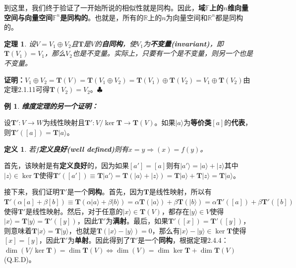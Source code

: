\documentclass[mathserif,hyperref,UTF8,openany,b5paper]{ctexbook}
\newtheorem{exmp}{例}[section]
\newtheorem{defn}{定义}[section]
\newtheorem{thm}{定理}[section]
\begin{document}
到这里，我们终于验证了一开始所说的相似性就是同构。因此，\textbf{域$\mathbb{F}$上的$n$维向量空间与向量空间$\mathbb{F}^n$是同构的}。也就是，所有的$\mathbb{R}$上的$n$为向量空间和$\mathbb{R}^n$都是同构的。
\begin{thm}
设$V = V_1\oplus V_2$且$\mathbf{T}$是$V$的\textbf{自同构}，使$V_1$为\textbf{不变量(invariant)}，即$\mathbf{T}(V_1) = V_1$，那么$V_2$也是不变量。实际上，只要有一个是不变量，则另一个也是不变量。
\end{thm}
\textbf{证明：}$V_1\oplus V_2=\mathbf{T}(V)=\mathbf{T}(V_1\oplus V_2)=\mathbf{T}(V_1)\oplus\mathbf{T}(V_2)=V_1\oplus \mathbf{T}(V_2)$由定理2.1.11可得$\mathbf{T}(V_2)=V_2$。$\clubsuit$
\begin{exmp}\textbf{维度定理的另一个证明：}\end{exmp}

设$\mathbf{T}':V\xrightarrow{}W$为线性映射且$\mathbf{T}':V/\ker\mathbf{T}\xrightarrow{}\mathbf{T}(V)$。如果$|a\rangle$为\textbf{等价类}$[a]$的\textbf{代表}，则$\mathbf{T}'([a])=\mathbf{T}|a\rangle$。\begin{defn}
若$f$\textbf{定义良好(well defined)}则有$x=y\Rightarrow(x)=f(y)$。
\end{defn}首先，该映射是有\textbf{定义良好}的，因为如果$[a']=[a]$则有$|a'\rangle=|a\rangle+|z\rangle$其中$|z\rangle\in\ker\mathbf{T}$使得$\mathbf{T'}([a'])\equiv\mathbf{T}|a'\rangle=\mathbf{T}(|a\rangle+|z\rangle)=\mathbf{T}|a\rangle+\mathbf{T}|z\rangle=\mathbf{T}|a\rangle$。

接下来，我们证明$\mathbf{T'}$是一个\textbf{同构}。首先，因为$\mathbf{T}$是线性映射，所以有 $\mathbf{T'}(\alpha[a]+\beta[b])\equiv\mathbf{T}(\alpha|a\rangle+\beta|b\rangle)=\alpha\mathbf{T}(|a\rangle)+\beta\mathbf{T}(|b\rangle)=\alpha\mathbf{T'}([a])+\beta\mathbf{T'}([b])$
使得$\mathbf{T'}$是线性映射。然后，对于任意的$|x\rangle\in\mathbf{T}(V)$，都存在$|y\rangle\in V$使得$|x\rangle=\mathbf{T}|y\rangle=\mathbf{T'}([y])$，因此$\mathbf{T'}$为\textbf{满射}。最后，如果$\mathbf{T'}([x])=\mathbf{T'}([y])$，则意味着$\mathbf{T}|x\rangle=\mathbf{T}|y\rangle$，也就是$\mathbf{T}(|x\rangle-|y\rangle)=0$，那么有$|x\rangle-|y\rangle\in\ker\mathbf{T}$使得$[x]=[y]$，因此$\mathbf{T'}$为\textbf{单射}。因此得到了$\mathbf{T'}$是一个\textbf{同构}，根据定理2.4.4：$\dim(V/\ker\mathbf{T})=\dim\mathbf{T}(V)\Leftrightarrow\dim(V)=\dim\ker\mathbf{T}+\dim\mathbf{T}(V)$(Q.E.D)。
\end{document}
